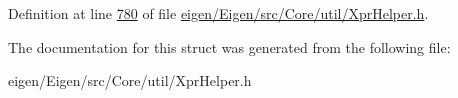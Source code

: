 Definition at line \hyperlink{eigen_2_eigen_2src_2_core_2util_2_xpr_helper_8h_source_l00780}{780} of file \hyperlink{eigen_2_eigen_2src_2_core_2util_2_xpr_helper_8h_source}{eigen/\+Eigen/src/\+Core/util/\+Xpr\+Helper.\+h}.



The documentation for this struct was generated from the following file\+:\begin{DoxyCompactItemize}
\item 
eigen/\+Eigen/src/\+Core/util/\+Xpr\+Helper.\+h\end{DoxyCompactItemize}
